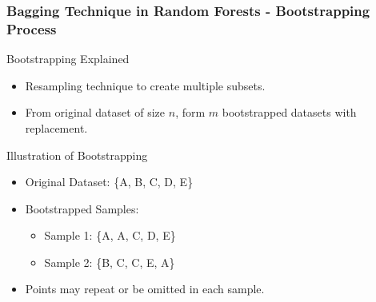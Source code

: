 \documentclass[aspectratio=169]{beamer}
\begin{document}
\begin{frame}[fragile]
    \frametitle{Bagging Technique in Random Forests - Bootstrapping Process}
    \begin{block}{Bootstrapping Explained}
        \begin{itemize}
            \item Resampling technique to create multiple subsets.
            \item From original dataset of size \( n \), form \( m \) bootstrapped datasets with replacement.
        \end{itemize}
    \end{block}
    
    \begin{block}{Illustration of Bootstrapping}
        \begin{itemize}
            \item Original Dataset: \{A, B, C, D, E\}
            \item Bootstrapped Samples:
            \begin{itemize}
                \item Sample 1: \{A, A, C, D, E\}
                \item Sample 2: \{B, C, C, E, A\}
            \end{itemize}
            \item Points may repeat or be omitted in each sample.
        \end{itemize}
    \end{block}
\end{frame}
\end{document}
